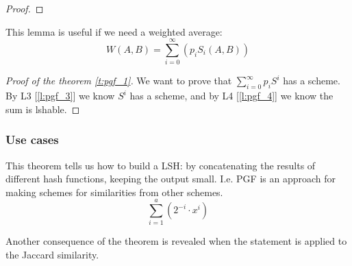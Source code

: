 \begin{proof}

\end{proof}

This lemma is useful if we need a weighted average:
\[
	W(A,B) = \sum_{i=0}^{\infty}(p_i S_i(A, B))
\]

\begin{proof}[Proof of the theorem \ref{t:pgf_1}]
	We want to prove that $\sum_{i = 0}^{\infty} p_i S^i$ has a scheme. By L3 [\ref{l:pgf_3}] we know $S^i$ has a scheme, and by L4 [\ref{l:pgf_4}] we know the sum is lshable.
\end{proof}	


\subsubsection{Use cases}

\obs This theorem tells us how to build a LSH: by concatenating the results of different hash functions, keeping the output small. I.e. PGF is an approach for making schemes for similarities from other schemes.
\[
	\sum_{i=1}^{a}(2^{-i} \cdot x^i)
\]

Another consequence of the theorem is revealed when the statement is applied to the Jaccard similarity.

